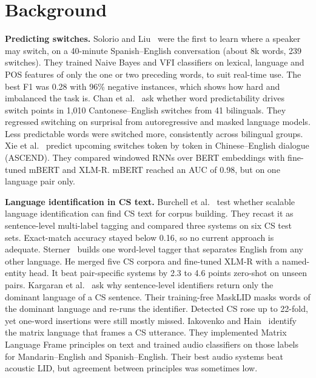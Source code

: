 \documentclass[sigconf,nonacm]{acmart}
\begin{document}
\section{Background}
\textbf{Predicting switches.} Solorio and Liu~\cite{solorio2008predict} were the first to learn where a
speaker may switch, on a 40-minute Spanish--English conversation (about 8k words, 239 switches). They
trained Naive Bayes and VFI classifiers on lexical, language and POS features of only the one or two
preceding words, to suit real-time use. The best F1 was 0.28 with 96\% negative instances, which shows how
hard and imbalanced the task is. Chan et al.~\cite{chan2026predictability} ask whether word predictability
drives switch points in 1,010 Cantonese--English switches from 41 bilinguals. They regressed switching on
surprisal from autoregressive and masked language models. Less predictable words were switched more,
consistently across bilingual groups. Xie et al.~\cite{xie2025beyond} predict upcoming switches token by token
in Chinese--English dialogue (ASCEND). They compared windowed RNNs over BERT embeddings with fine-tuned mBERT
and XLM-R. mBERT reached an AUC of 0.98, but on one language pair only.

\textbf{Language identification in CS text.} Burchell et al.~\cite{burchell2024harder} test whether scalable
language identification can find CS text for corpus building. They recast it as sentence-level multi-label
tagging and compared three systems on six CS test sets. Exact-match accuracy stayed below 0.16, so no current
approach is adequate. Sterner~\cite{sterner2024english} builds one word-level tagger that separates English
from any other language. He merged five CS corpora and fine-tuned XLM-R with a named-entity head. It beat
pair-specific systems by 2.3 to 4.6 points zero-shot on unseen pairs. Kargaran et al.~\cite{kargaran2024masklid}
ask why sentence-level identifiers return only the dominant language of a CS sentence. Their training-free
MaskLID masks words of the dominant language and re-runs the identifier. Detected CS rose up to 22-fold, yet
one-word insertions were still mostly missed. Iakovenko and Hain~\cite{iakovenko2024matrix} identify the
matrix language that frames a CS utterance. They implemented Matrix Language Frame principles on text and
trained audio classifiers on those labels for Mandarin--English and Spanish--English. Their best audio systems
beat acoustic LID, but agreement between principles was sometimes low.
\end{document}
